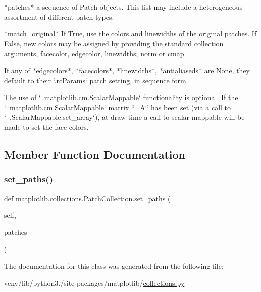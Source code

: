 \begin{DoxyVerb}*patches*
    a sequence of Patch objects.  This list may include
    a heterogeneous assortment of different patch types.

*match_original*
    If True, use the colors and linewidths of the original
    patches.  If False, new colors may be assigned by
    providing the standard collection arguments, facecolor,
    edgecolor, linewidths, norm or cmap.

If any of *edgecolors*, *facecolors*, *linewidths*, *antialiaseds* are
None, they default to their `.rcParams` patch setting, in sequence
form.

The use of `~matplotlib.cm.ScalarMappable` functionality is optional.
If the `~matplotlib.cm.ScalarMappable` matrix ``_A`` has been set (via
a call to `~.ScalarMappable.set_array`), at draw time a call to scalar
mappable will be made to set the face colors.
\end{DoxyVerb}
 

\subsection{Member Function Documentation}
\mbox{\label{classmatplotlib_1_1collections_1_1PatchCollection_a5c4266f33d8ad1a60c8528963f6cdcdd}} 
\subsubsection{\texorpdfstring{set\+\_\+paths()}{set\_paths()}}
{\footnotesize\ttfamily def matplotlib.\+collections.\+Patch\+Collection.\+set\+\_\+paths (\begin{DoxyParamCaption}\item[{}]{self,  }\item[{}]{patches }\end{DoxyParamCaption})}



The documentation for this class was generated from the following file\+:\begin{DoxyCompactItemize}
\item 
venv/lib/python3./site-\/packages/matplotlib/\hyperlink{collections_8py}{collections.\+py}\end{DoxyCompactItemize}
